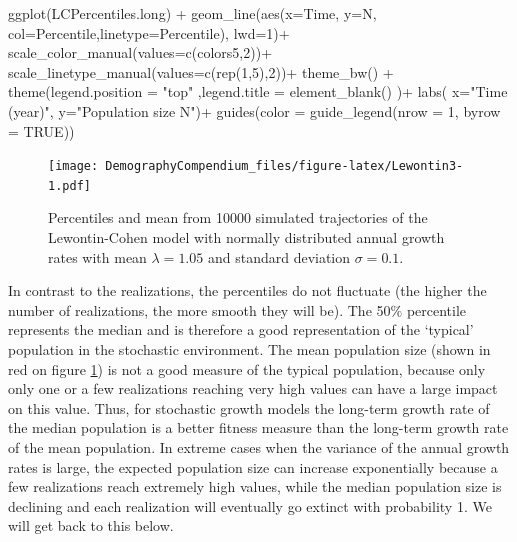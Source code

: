\documentclass[
]{book}
\newenvironment{Shaded}{\begin{snugshade}}{\end{snugshade}}
\newcommand{\AttributeTok}[1]{\textcolor[rgb]{0.77,0.63,0.00}{#1}}
\newcommand{\ConstantTok}[1]{\textcolor[rgb]{0.00,0.00,0.00}{#1}}
\newcommand{\DecValTok}[1]{\textcolor[rgb]{0.00,0.00,0.81}{#1}}
\newcommand{\FunctionTok}[1]{\textcolor[rgb]{0.00,0.00,0.00}{#1}}
\newcommand{\NormalTok}[1]{#1}
\newcommand{\SpecialCharTok}[1]{\textcolor[rgb]{0.00,0.00,0.00}{#1}}
\newcommand{\StringTok}[1]{\textcolor[rgb]{0.31,0.60,0.02}{#1}}
\begin{document}
\begin{Shaded}
\begin{Highlighting}[]
\FunctionTok{ggplot}\NormalTok{(LCPercentiles.long) }\SpecialCharTok{+} 
  \FunctionTok{geom\_line}\NormalTok{(}\FunctionTok{aes}\NormalTok{(}\AttributeTok{x=}\NormalTok{Time, }\AttributeTok{y=}\NormalTok{N, }\AttributeTok{col=}\NormalTok{Percentile,}\AttributeTok{linetype=}\NormalTok{Percentile), }\AttributeTok{lwd=}\DecValTok{1}\NormalTok{)}\SpecialCharTok{+}
  \FunctionTok{scale\_color\_manual}\NormalTok{(}\AttributeTok{values=}\FunctionTok{c}\NormalTok{(colors5,}\DecValTok{2}\NormalTok{))}\SpecialCharTok{+}
  \FunctionTok{scale\_linetype\_manual}\NormalTok{(}\AttributeTok{values=}\FunctionTok{c}\NormalTok{(}\FunctionTok{rep}\NormalTok{(}\DecValTok{1}\NormalTok{,}\DecValTok{5}\NormalTok{),}\DecValTok{2}\NormalTok{))}\SpecialCharTok{+}
  \FunctionTok{theme\_bw}\NormalTok{() }\SpecialCharTok{+}
   \FunctionTok{theme}\NormalTok{(}\AttributeTok{legend.position =} \StringTok{"top"}\NormalTok{ ,}\AttributeTok{legend.title =} \FunctionTok{element\_blank}\NormalTok{() )}\SpecialCharTok{+}
  \FunctionTok{labs}\NormalTok{( }\AttributeTok{x=}\StringTok{"Time (year)"}\NormalTok{, }\AttributeTok{y=}\StringTok{"Population size N"}\NormalTok{)}\SpecialCharTok{+}
  \FunctionTok{guides}\NormalTok{(}\AttributeTok{color =} \FunctionTok{guide\_legend}\NormalTok{(}\AttributeTok{nrow =} \DecValTok{1}\NormalTok{, }\AttributeTok{byrow =} \ConstantTok{TRUE}\NormalTok{))}
\end{Highlighting}
\end{Shaded}

\begin{figure}
\centering
\texttt{[image: DemographyCompendium\_files/figure-latex/Lewontin3-1.pdf]}
\caption{\label{fig:Lewontin3}Percentiles and mean from 10000 simulated trajectories of the Lewontin-Cohen model with normally distributed annual growth rates with mean \(\lambda=1.05\) and standard deviation \(\sigma=0.1\).}
\end{figure}

In contrast to the realizations, the percentiles do not fluctuate (the higher the number of realizations, the more smooth they will be). The 50\(\%\) percentile represents the median and is therefore a good representation of the `typical' population in the stochastic environment. The mean population size (shown in red on figure \ref{fig:Lewontin3}) is not a good measure of the typical population, because only only one or a few realizations reaching very high values can have a large impact on this value. Thus, for stochastic growth models the long-term growth rate of the median population is a better fitness measure than the long-term growth rate of the mean population. In extreme cases when the variance of the annual growth rates is large, the expected population size can increase exponentially because a few realizations reach extremely high values, while the median population size is declining and each realization will eventually go extinct with probability 1.
We will get back to this below.
\end{document}
